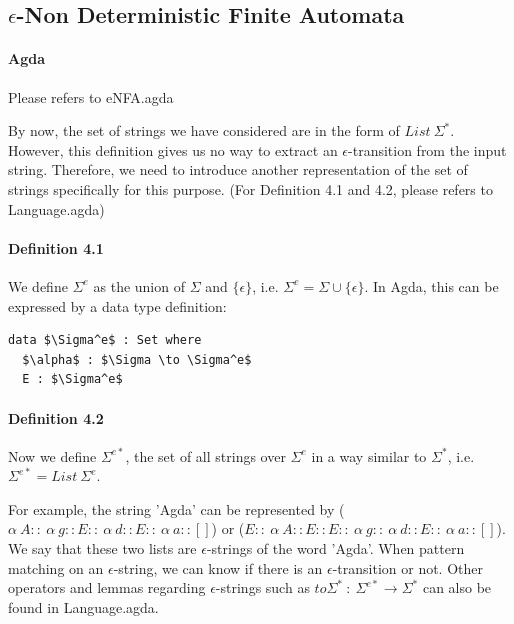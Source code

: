 \documentclass[twoside,openright,final]{bhamthesis}
\begin{document}
\subsection{\(\epsilon\)-Non Deterministic Finite Automata}
\paragraph{Agda} Please refers to eNFA.agda \\

\par By now, the set of strings we have considered are in the form of
\(List\ \Sigma^*\). However, this definition gives us no way to
extract an \(\epsilon\)-transition from the input string. Therefore, we need to introduce another
representation of the set of strings specifically for this purpose. (For Definition 4.1 and
4.2, please refers to Language.agda)

\paragraph{Definition 4.1} We define \(\Sigma^e\) as the union of
\(\Sigma\) and \(\{\epsilon\}\), i.e. \(\Sigma^e = \Sigma \cup
\{\epsilon\}\). In Agda, this can be expressed by a data type definition:
\begin{lstlisting}[mathescape=true,xleftmargin=.4\textwidth,aboveskip=0pt,belowskip=0pt]
data $\Sigma^e$ : Set where
  $\alpha$ : $\Sigma \to \Sigma^e$
  E : $\Sigma^e$
\end{lstlisting}

\paragraph{Definition 4.2} Now we define \(\Sigma^{e*}\), the set of all strings over
\(\Sigma^e\) in a way similar to \(\Sigma^*\), i.e. \(\Sigma^{e*} =
List\ \Sigma^e\). \\

\par For example, the string 'Agda' can be
represented by (\(\alpha\ A ::\ \alpha\ g :: E ::\ \alpha\ d :: E ::\ \alpha\
a :: []\)) or (\(E ::\ \alpha\ A :: E :: E ::\ \alpha\ g ::\ \alpha\ d :: E ::\ \alpha\
a :: []\)). We say that these two lists are
\(\epsilon\)-strings of the word 'Agda'. When pattern matching on an \(\epsilon\)-string, we
can know if there is an \(\epsilon\)-transition or not. Other operators and lemmas
regarding \(\epsilon\)-strings such
as \(to\Sigma^*\ :\ \Sigma^{e*} \to \Sigma^*\) can also be found in
Language.agda. 
\end{document}
